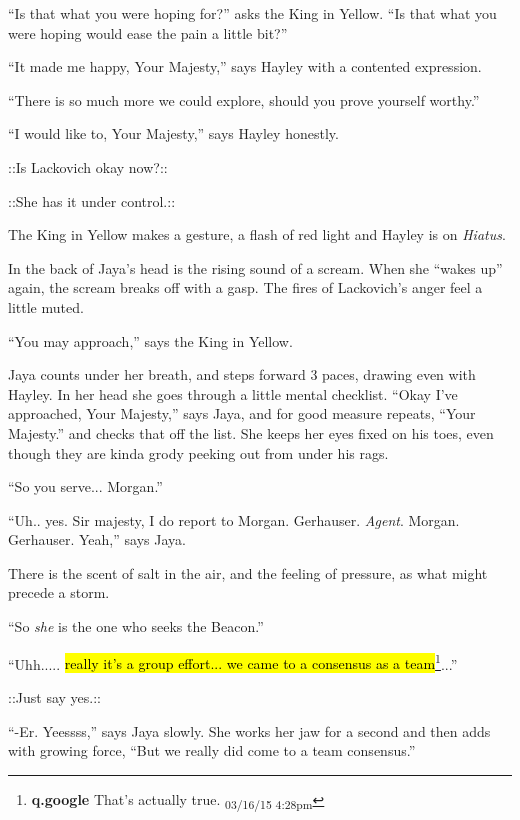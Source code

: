 ``Is that what you were hoping for?'' asks the King in Yellow.  ``Is that what you were hoping would ease the pain a little bit?''

``It made me happy, Your Majesty,'' says Hayley with a contented expression.

``There is so much more we could explore, should you prove yourself worthy.''

``I would like to, Your Majesty,'' says Hayley honestly.

 {\color[RGB]{255,153,0}::Is Lackovich okay now?::} 

 {\color[RGB]{153,0,255}::She has it under control.::} 



The King in Yellow makes a gesture, a flash of red light and Hayley is on \textit{Hiatus}.





In the back of Jaya's head is the rising sound of a scream.  When she ``wakes up'' again, the scream breaks off with a gasp.  The fires of Lackovich's anger feel a little muted.

``You may approach,'' says the King in Yellow.

Jaya counts under her breath, and steps forward 3 paces, drawing even with Hayley.  In her head she goes through a little mental checklist.   ``Okay I've approached, Your Majesty,'' says Jaya, and for good measure repeats, ``Your Majesty.'' and checks that off the list.  She keeps her eyes fixed on his toes, even though they are kinda grody peeking out from under his rags.

``So you serve... Morgan.''

``Uh.. yes.  Sir majesty, I do report to Morgan.  Gerhauser.  \textit{Agent}.  Morgan. Gerhauser.  Yeah,'' says Jaya.

There is the scent of salt in the air, and the feeling of pressure, as what might precede a storm.

``So \textit{she} is the one who seeks the Beacon.''

``Uhh..... \hl{really it's a group effort... we came to a consensus as a team}\footnote{\textbf{q.google }That's actually true. \textsubscript{03/16/15 4:28pm}}...''

 {\color[RGB]{74,134,232}::Just say yes.::} 

``-Er.   Yeessss,'' says Jaya slowly.  She works her jaw for a second and then adds with growing force, ``But we really did come to a team consensus.''

